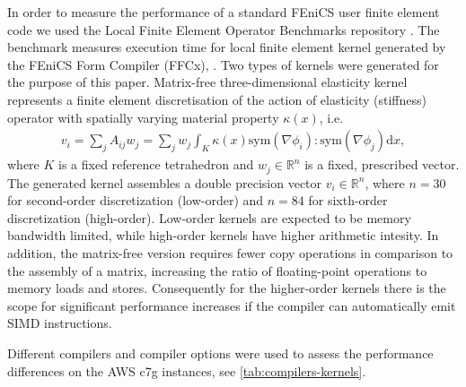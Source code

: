 In order to measure the performance of a standard FEniCS user finite element
code we used the Local Finite Element Operator Benchmarks repository
\cite{Baratta2023}. The benchmark measures execution time for local finite
element kernel generated by the FEniCS Form Compiler (FFCx), \cite{Habera2020}.
Two types of kernels were generated for the purpose of this paper. Matrix-free
three-dimensional elasticity kernel represents a finite element discretisation
of the action of elasticity (stiffness) operator with spatially varying material
property $\kappa(x)$, i.e.
\begin{align}
    v_i = \sum_j A_{ij} w_j = \sum_j w_j \int_K \kappa(x) \text{sym}(\nabla \phi_i) : \text{sym} (\nabla \phi_j) \mathrm dx,
\end{align}
where $K$ is a fixed reference tetrahedron and $w_j \in \mathbb{R}^{n}$ is a
fixed, prescribed vector. The generated kernel assembles a double precision
vector $v_i \in \mathbb{R}^{n}$, where $n = 30$ for second-order discretization
(low-order) and $n = 84$ for sixth-order discretization (high-order). Low-order
kernels are expected to be memory bandwidth limited, while high-order kernels
have higher arithmetic intesity. In addition, the matrix-free version requires
fewer copy operations in comparison to the assembly of a matrix, increasing the
ratio of floating-point operations to memory loads and stores. Consequently for
the higher-order kernels there is the scope for significant performance
increases if the compiler can automatically emit SIMD instructions.

Different compilers and compiler options were used to assess the performance
differences on the AWS c7g instances, see \autoref{tab:compilers-kernels}.

